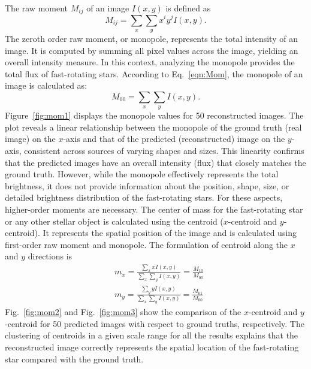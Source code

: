 The raw moment $M_{ij}$ of an image $I(x, y)$ is defined as \citep{hu1962visual}
\begin{equation}
	M_{ij} = \sum_{x} \sum_{y} x^i y^j I(x, y).
	\label{eqn:Mom}
\end{equation}
The zeroth order raw moment, or monopole, represents the total intensity of an image. It is computed by summing all pixel values across the image, yielding an overall intensity measure. In this context, analyzing the monopole provides the total flux of fast-rotating stars. According to Eq.~\eqref{eqn:Mom}, the monopole of an image is calculated as:
\begin{equation}
	M_{00} = \sum_{x} \sum_{y} I(x, y).
\end{equation}
Figure~\ref{fig:mom1} displays the monopole values for 50 reconstructed images. The plot reveals a linear relationship between the monopole of the ground truth (real image) on the $x$-axis and that of the predicted (reconstructed) image on the $y$-axis, consistent across sources of varying shapes and sizes. This linearity confirms that the predicted images have an overall intensity (flux) that closely matches the ground truth. However, while the monopole effectively represents the total brightness, it does not provide information about the position, shape, size, or detailed brightness distribution of the fast-rotating stars. For these aspects, higher-order moments are necessary.
The center of mass for the fast-rotating star or any other stellar object is calculated using the centroid ($x$-centroid and $y$-centroid). It represents the spatial position of the image and is calculated using first-order raw moment and monopole. The formulation of centroid along the $x$ and $y$ directions is
\begin{equation}
	\begin{aligned}
		&m_x = \frac{\sum_{x} x I(x,y)}{\sum_{x} \sum_{y} I(x, y)} = \frac{M_{10}}{M_{00}} \\
		&m_y = \frac{\sum_{y} y I(x,y)}{\sum_{x} \sum_{y} I(x, y)} = \frac{M_{01}}{M_{00}}
	\end{aligned}  
\end{equation}
Fig.~\ref{fig:mom2} and Fig.~\ref{fig:mom3} show the comparison of the $x$-centroid and $y$-centroid for 50 predicted images with respect to ground truths, respectively. The clustering of centroids in a given scale range for all the results explains that the reconstructed image correctly represents the spatial location of the fast-rotating star compared with the ground truth.

